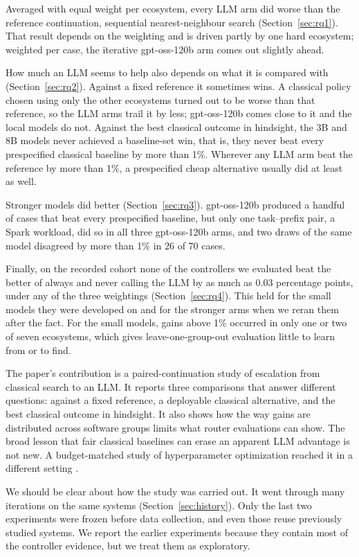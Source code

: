 Averaged with equal weight per ecosystem, every LLM arm did worse than the reference continuation, sequential nearest-neighbour search (Section~\ref{sec:rq1}). That result depends on the weighting and is driven partly by one hard ecosystem; weighted per case, the iterative gpt-oss-120b arm comes out slightly ahead.

How much an LLM seems to help also depends on what it is compared with (Section~\ref{sec:rq2}). Against a fixed reference it sometimes wins. A classical policy chosen using only the other ecosystems turned out to be worse than that reference, so the LLM arms trail it by less; gpt-oss-120b comes close to it and the local models do not. Against the best classical outcome in hindsight, the 3B and 8B models never achieved a baseline-set win, that is, they never beat every prespecified classical baseline by more than 1\%. Wherever any LLM arm beat the reference by more than 1\%, a prespecified cheap alternative usually did at least as well.

Stronger models did better (Section~\ref{sec:rq3}). gpt-oss-120b produced a handful of cases that beat every prespecified baseline, but only one task--prefix pair, a Spark workload, did so in all three gpt-oss-120b arms, and two draws of the same model disagreed by more than 1\% in 26 of 70 cases.

Finally, on the recorded cohort none of the controllers we evaluated beat the better of always and never calling the LLM by as much as 0.03 percentage points, under any of the three weightings (Section~\ref{sec:rq4}). This held for the small models they were developed on and for the stronger arms when we reran them after the fact. For the small models, gains above 1\% occurred in only one or two of seven ecosystems, which gives leave-one-group-out evaluation little to learn from or to find.

The paper's contribution is a paired-continuation study of escalation from classical search to an LLM. It reports three comparisons that answer different questions: against a fixed reference, a deployable classical alternative, and the best classical outcome in hindsight. It also shows how the way gains are distributed across software groups limits what router evaluations can show. The broad lesson that fair classical baselines can erase an apparent LLM advantage is not new. A budget-matched study of hyperparameter optimization reached it in a different setting \cite{rodrigues2026worth}.

We should be clear about how the study was carried out. It went through many iterations on the same systems (Section~\ref{sec:history}). Only the last two experiments were frozen before data collection, and even those reuse previously studied systems. We report the earlier experiments because they contain most of the controller evidence, but we treat them as exploratory.

